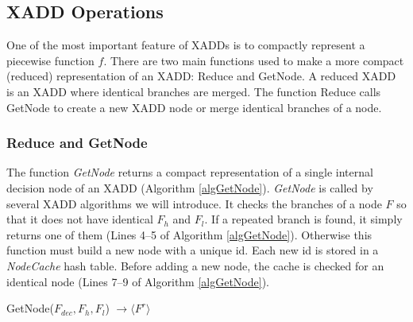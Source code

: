\documentclass[twoside,11pt]{article}
\begin{document}
\subsection{XADD Operations}
\label{sec:xaddoperations}

One of the most important feature of XADDs is to compactly represent a piecewise function $f$. There are two main functions used to make a more compact (reduced) representation of an XADD: Reduce and GetNode. A reduced XADD is an XADD where identical branches are merged. The function Reduce calls GetNode to create a new XADD node or merge identical branches of a node. 


\subsubsection{Reduce and GetNode}

The function \emph{GetNode} returns a compact representation of a single internal decision node of an XADD (Algorithm \ref{algGetNode}). \emph{GetNode} is called by several XADD algorithms we will introduce. It checks the branches of a node $F$ so that it does not have identical $F_h$ and $F_l$. If a repeated branch is found, it simply returns one of them (Lines 4--5 of Algorithm \ref{algGetNode}). Otherwise this function must build a new node with a unique id. Each new id is stored in a  \emph{NodeCache} hash table. Before adding a new node, the cache is checked for an identical node (Lines 7--9 of Algorithm \ref{algGetNode}). 

\incmargin{.5em}
\begin{algorithm}[t!]
\dontprintsemicolon
{}
\caption{{\sc GetNode}($F_{\mathit{dec}}, F_h, F_l$) $\longrightarrow \langle F^r \rangle$\label{algGetNode}}
\end{algorithm}
\decmargin{.5em}
\end{document}
